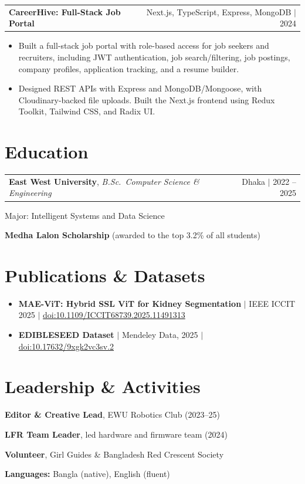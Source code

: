 \documentclass[letterpaper,10pt]{article}
\makeatletter
\newcommand{\cvsection}[1]{\needspace{5\baselineskip}\section{#1}}
\newcommand{\tworow}[2]{%
  \begin{tabular*}{\textwidth}{@{}l@{\extracolsep{\fill}}r@{}}#1 & #2\end{tabular*}\par}
\newcommand{\projectnolink}[2]{%
  \needspace{4\baselineskip}%
  \tworow{\textbf{#1}}{\footnotesize\color{midgray}#2}\vspace{1pt}}
\makeatother
\begin{document}
\vspace{3pt}
\projectnolink{CareerHive: Full-Stack Job Portal}{Next.js, TypeScript, Express, MongoDB $|$ 2024}
\begin{itemize}
  \item Built a full-stack job portal with role-based access for job seekers and recruiters, including JWT authentication, job search/filtering, job postings, company profiles, application tracking, and a resume builder.
  \item Designed REST APIs with Express and MongoDB/Mongoose, with Cloudinary-backed file uploads. Built the Next.js frontend using Redux Toolkit, Tailwind CSS, and Radix UI.
\end{itemize}

\cvsection{Education}

\tworow{\textbf{East West University}, \textit{B.Sc.\ Computer Science \& Engineering}}{\small Dhaka {\color{midgray}$|$} 2022 -- 2025}
Major: Intelligent Systems and Data Science\par
\textbf{Medha Lalon Scholarship} {\small\color{midgray}(awarded to the top 3.2\% of all students)}

\cvsection{Publications \& Datasets}
\begin{itemize}
  \item \textbf{MAE-ViT: Hybrid SSL ViT for Kidney Segmentation} {\color{midgray}$|$} IEEE ICCIT 2025 {\color{midgray}$|$} \href{https://doi.org/10.1109/ICCIT68739.2025.11491313}{doi:10.1109/ICCIT68739.2025.11491313}
  \item \textbf{EDIBLESEED Dataset} {\color{midgray}$|$} Mendeley Data, 2025 {\color{midgray}$|$} \href{https://doi.org/10.17632/9xgk2vc3sv.2}{doi:10.17632/9xgk2vc3sv.2}
\end{itemize}

\cvsection{Leadership \& Activities}

\textbf{Editor \& Creative Lead}, EWU Robotics Club {\small\color{midgray}(2023--25)}\par
\textbf{LFR Team Leader}, led hardware and firmware team {\small\color{midgray}(2024)}\par
\textbf{Volunteer}, Girl Guides \& Bangladesh Red Crescent Society\par
\textbf{Languages:} Bangla (native), English (fluent)
\end{document}

